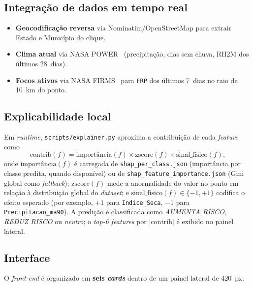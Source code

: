 \subsection{Integração de dados em tempo real}

\begin{itemize}
  \item \textbf{Geocodificação reversa} via Nominatim/OpenStreetMap para extrair Estado e Município do clique.
  \item \textbf{Clima atual} via NASA POWER~\cite{nasapower} (precipitação, dias sem chuva, RH2M dos últimos 28~dias).
  \item \textbf{Focos ativos} via NASA FIRMS~\cite{nasafirms} para \texttt{FRP} dos últimos 7~dias no raio de \SI{10}{\km} do ponto.
\end{itemize}

\subsection{Explicabilidade local}

Em \emph{runtime}, \texttt{scripts/explainer.py} aproxima a contribuição de cada \emph{feature} como
\begin{equation}
\text{contrib}(f) = \text{importância}(f) \times \text{zscore}(f) \times \text{sinal\_físico}(f),
\end{equation}
onde \(\text{importância}(f)\) é carregada de \texttt{shap\_per\_class.json} (importância por classe predita, quando disponível) ou de \texttt{shap\_feature\_importance.json} (Gini global como \emph{fallback}); \(\text{zscore}(f)\) mede a anormalidade do valor no ponto em relação à distribuição global do \emph{dataset}; e \(\text{sinal\_físico}(f) \in \{-1, +1\}\) codifica o efeito esperado (por exemplo, \(+1\) para \texttt{Indice\_Seca}, \(-1\) para \texttt{Precipitacao\_ma90}). A predição é classificada como \emph{AUMENTA RISCO}, \emph{REDUZ RISCO} ou \emph{neutro}; o \emph{top-6 features} por \(|\text{contrib}|\) é exibido no painel lateral.

\subsection{Interface}

O \emph{front-end} é organizado em \textbf{seis \emph{cards}} dentro de um painel lateral de \SI{420}{px}:

